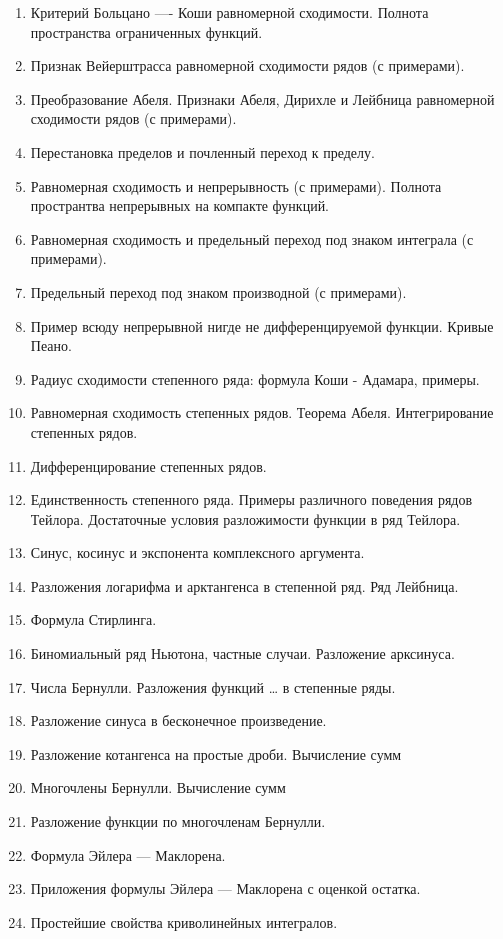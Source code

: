 \documentclass[12pt, a4paper, oneside]{memoir}
\begin{document}
\begin{enumerate}
\item Критерий Больцано —- Коши равномерной сходимости. Полнота пространства ограниченных функций.
\item Признак Вейерштрасса равномерной сходимости рядов (с примерами).
\item Преобразование Абеля. Признаки Абеля, Дирихле и Лейбница равномерной сходимости рядов (с примерами).
\item Перестановка пределов и почленный переход к пределу.
\item Равномерная сходимость и непрерывность (с примерами). Полнота пространтва непрерывных на компакте функций.
\item Равномерная сходимость и предельный переход под знаком интеграла (с примерами).
\item Предельный переход под знаком производной (с примерами).
\item Пример всюду непрерывной нигде не дифференцируемой функции. Кривые Пеано.
\item Радиус сходимости степенного ряда: формула Коши - Адамара, примеры.
\item Равномерная сходимость степенных рядов. Теорема Абеля. Интегрирование степенных рядов.
\item Дифференцирование степенных рядов.
\item Единственность степенного ряда. Примеры различного поведения рядов Тейлора. Достаточные условия разложимости функции в ряд Тейлора.
\item Синус, косинус и экспонента комплексного аргумента.
\item Разложения логарифма и арктангенса в степенной ряд. Ряд Лейбница.
\item Формула Стирлинга.
\item Биномиальный ряд Ньютона, частные случаи. Разложение арксинуса.
\item Числа Бернулли. Разложения функций … в степенные ряды.
\item Разложение синуса в бесконечное произведение.
\item Разложение котангенса на простые дроби. Вычисление сумм 
\item Многочлены Бернулли. Вычисление сумм 
\item Разложение функции по многочленам Бернулли.
\item Формула Эйлера — Маклорена.
\item Приложения формулы Эйлера — Маклорена с оценкой остатка.
\item Простейшие свойства криволинейных интегралов.

\end{enumerate}
\end{document}
